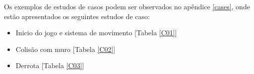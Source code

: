 

Os exemplos de estudos de casos podem ser observados no apêndice \ref{cases}, onde estão apresentados os seguintes estudos de caso:

\begin{itemize}
	\item Inicio do jogo e sistema de movimento [Tabela \ref{C01}]
	\item Colisão com muro [Tabela \ref{C02}]
	\item Derrota [Tabela \ref{C03}]
\end{itemize}
